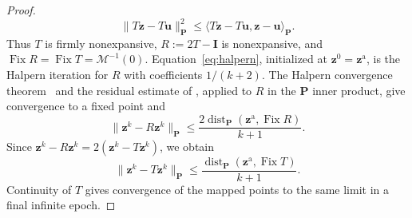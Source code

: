 \begin{proof}
\begin{equation*}
\|T\mathbf{z}-T\mathbf{u}\|_\mathbf{P}^2\leq\langle T\mathbf{z}-T\mathbf{u},\mathbf{z}-\mathbf{u}\rangle_\mathbf{P}.
\end{equation*}
Thus $T$ is firmly nonexpansive, $R:=2T-\mathbf{I}$ is nonexpansive, and $\operatorname{Fix}R=\operatorname{Fix}T=\mathcal M^{-1}(0)$.
Equation~\eqref{eq:halpern}, initialized at $\mathbf{z}^0=\mathbf{z}^{\mathrm a}$, is the Halpern iteration for $R$ with coefficients $1/(k+2)$.
The Halpern convergence theorem~\citep{wittmann1992approximation} and the residual estimate of \citet[Theorem~2.1]{lieder2021convergence}, applied to $R$ in the $\mathbf P$ inner product, give convergence to a fixed point and
\begin{equation*}
\|\mathbf{z}^k-R\mathbf{z}^k\|_\mathbf{P}\leq\frac{2\operatorname{dist}_\mathbf{P}(\mathbf{z}^{\mathrm a},\operatorname{Fix}R)}{k+1}.
\end{equation*}
Since $\mathbf{z}^k-R\mathbf{z}^k=2(\mathbf{z}^k-T\mathbf{z}^k)$, we obtain
\begin{equation}
\label{eq:pduot-halpern-bound}
\|\mathbf z^k-T\mathbf z^k\|_{\mathbf P}\leq\frac{\operatorname{dist}_{\mathbf P}(\mathbf z^{\mathrm a},\operatorname{Fix}T)}{k+1}.
\end{equation}
Continuity of $T$ gives convergence of the mapped points to the same limit in a final infinite epoch.


\end{proof}
